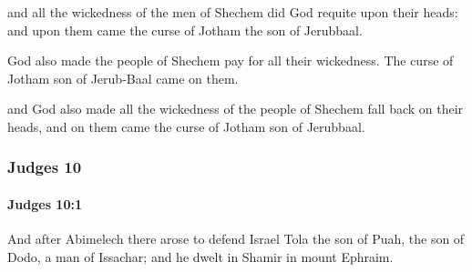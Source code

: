 			\begin{versebox}
					\item[BHS] 
					\item[ASV] and all the wickedness of the men of Shechem did God requite upon their heads: and upon them came the curse of Jotham the son of Jerubbaal.
					\item[NIV] God also made the people of Shechem pay for all their wickedness. The curse of Jotham son of Jerub-Baal came on them.
					\item[NRSV] and God also made all the wickedness of the people of Shechem fall back on their heads, and on them came the curse of Jotham son of Jerubbaal.
			\end{versebox}
	\subsubsection{Judges 10} %
		\label{JUDGES-10}

		\paragraph{Judges 10:1} %
			\label{JUDGES-10-1}

			And after Abimelech there arose to defend Israel Tola the son of Puah, the son of Dodo, a man of Issachar; and he dwelt in Shamir in mount Ephraim.

